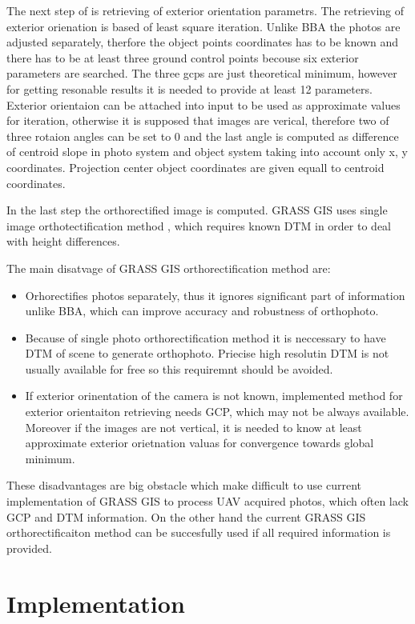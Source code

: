 \documentclass[a4paper,12pt]{report}
\begin{document}
\begin{itemize}
The next step of is retrieving of exterior orientation parametrs. The retrieving 
of exterior orienation is based of least square iteration. Unlike BBA
the photos are adjusted separately, therfore the object points coordinates has to be known
and there has to be at least three ground control points becouse six exterior parameters are 
searched. The three gcps are just theoretical minimum, however for getting resonable 
results it is needed to provide at least 12 parameters. Exterior orientaion 
can be attached into input to be used as approximate values for iteration,
otherwise it is supposed that images are verical, therefore two of three rotaion
angles can be set to 0 and the last angle is computed as difference of centroid slope
in photo system and object system taking into account only x, y coordinates.
Projection center object coordinates are given equall to centroid coordinates.

In the last step the orthorectified image is computed. GRASS GIS uses single image orthotectification
method \label{sec:single_ortho}, which requires known DTM in order to deal with height differences. 


The main disatvage of GRASS GIS orthorectification method are:
\begin{itemize}
\item Orhorectifies photos separately, thus it ignores significant part of information unlike BBA,
 which can improve accuracy and robustness of orthophoto. 
\item Because of single photo orthorectification method it is neccessary to have DTM of scene to 
generate orthophoto. Priecise high resolutin DTM is not usually available for free so this 
requiremnt should be avoided.
\item If exterior orinentation of the camera is not known, implemented method for exterior
orientaiton retrieving needs GCP, which may not be always available. Moreover  if the images 
are not vertical, it is needed to know at least approximate exterior orietnation valuas for 
convergence towards global minimum.
\end{itemize}

These disadvantages are big obstacle which make difficult to use current implementation of GRASS GIS 
to process UAV acquired photos, which often lack GCP and DTM information.
On the other hand the current GRASS GIS orthorectificaiton method can be succesfully used  
if all required information is provided.

\chapter{Implementation}


\end{itemize}
\end{document}
